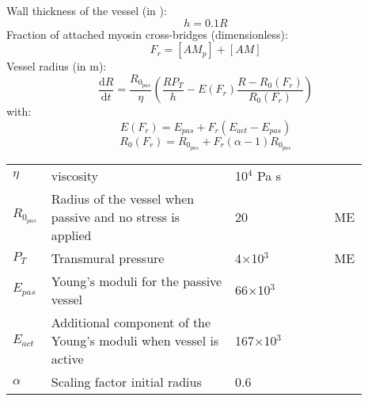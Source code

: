 Wall thickness of the vessel (in \um):
\begin{equation} \label{eq:h2}
h=0.1R
\end{equation}
%
Fraction of attached myosin cross-bridges (dimensionless):
\begin{equation}
F_r = [AM_p] + [AM]
\end{equation}
%
Vessel radius (in m):
\begin{equation} \label{eq:dRdt2e}
\dfrac{\mathrm{d}R}{\mathrm{d}t}= \frac{R_{0_{pas}}}{\eta}\left(   \frac{ R P_{T}}{h}  - E(F_r) \frac{R - R_0(F_r)}{R_0(F_r)} \right)
\end{equation}
%
with:
\begin{equation}
E(F_r)= E_{pas} + F_r \left(E_{act} - E_{pas} \right)
\end{equation}
%
\begin{equation}
R_0(F_r)=R_{0_{pas}} + F_r (\alpha -1) R_{0_{pas}}
\end{equation}
%
\newpage
\begin{table}[t!]
\centering
\begin{tabular}{ p{0.09\linewidth}  >{\footnotesize} p{0.5\linewidth}  >{\footnotesize} p{0.27\linewidth} >{\footnotesize} p{0.03\linewidth} }
\hline
$\eta   $				& viscosity															& 10$^4$ Pa s 		&  \cite{Koenigsberger2006}\\
$R_{0_{pas}}$			& Radius of the vessel when passive and no stress is applied		& 20  \um 		& ME \\
$P_T$					& Transmural pressure												& 4$\times$10$^3$ \Pa		& ME \\
${E}_{pas}$				& Young's moduli for the passive vessel								& 66$\times$10$^3$ \Pa 		&  \cite{Gore1985}\\
${E}_{act}$				& Additional component of the Young's moduli when vessel is active	& 167$\times$10$^3$ \Pa 	& \cite{Gore1985}\\
$\alpha$				& Scaling factor initial radius										& 0.6    		& \cite{Gore1985}\\
\hline
\end{tabular}
\label{tab:crossbridge}
\end{table}
\par
\par
\par
\par 
$~$
$~$
$~$
$~$
$~$
